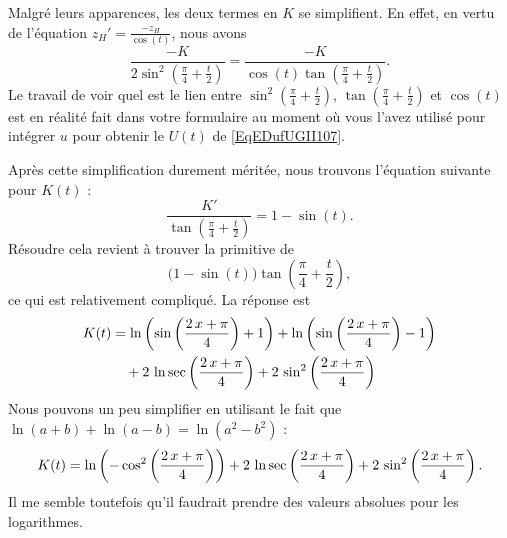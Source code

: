 \begin{example}
\begin{equation}
	\end{equation}
	Malgré leurs apparences, les deux termes en \( K\) se simplifient. En effet, en vertu de l'équation \( z_H'=\frac{ -z_H }{ \cos(t) }\), nous avons
	\begin{equation}
		\frac{ -K }{ 2\sin^2\left( \frac{ \pi }{ 4 }+\frac{ t }{ 2 } \right)}=\frac{ -K }{ \cos(t)\tan\left( \frac{ \pi }{ 4 }+\frac{ t }{ 2 } \right) }.
	\end{equation}
	Le travail de voir quel est le lien entre \( \sin^2\left( \frac{ \pi }{ 4 }+\frac{ t }{ 2 } \right)\), \( \tan\left( \frac{ \pi }{ 4 }+\frac{ t }{ 2 } \right)\) et \( \cos(t)\) est en réalité fait dans votre formulaire au moment où vous l'avez utilisé pour intégrer \( u\) pour obtenir le \( U(t)\) de \eqref{EqEDufUGII107}.

	Après cette simplification durement méritée, nous trouvons l'équation suivante pour \( K(t)\) :
	\begin{equation}		\label{EDEqFracII107exoVVprb}
		\frac{ K' }{ \tan\left( \frac{ \pi }{ 4 }+\frac{ t }{ 2 } \right) }=1-\sin(t).
	\end{equation}
	Résoudre cela revient à trouver la primitive de
	\begin{equation}
		\big( 1-\sin(t) \big) \tan\left( \frac{ \pi }{ 4 }+\frac{ t }{ 2 } \right),
	\end{equation}
	ce qui est relativement compliqué. La réponse est
	\begin{equation}
		\begin{aligned}[]
			K(t) & =\ln \left(\sin \left({{2\,x+\pi}\over{4}}\right)+1\right)+\ln  \left(\sin \left({{2\,x+\pi}\over{4}}\right)-1\right) \\
			     & \quad+2\,\ln \sec  \left({{2\,x+\pi}\over{4}}\right)+2\,\sin ^2\left({{2\,x+\pi}\over{4 }}\right)
		\end{aligned}
	\end{equation}
	Nous pouvons un peu simplifier en utilisant le fait que \( \ln(a+b)+\ln(a-b)=\ln(a^2-b^2)\) :
	\begin{equation}
		\begin{aligned}[]
			K(t)	=\ln\left(-\cos^2 \left({{2\,x+\pi}\over{4}}\right)\right)
			+2\,\ln \sec  \left({{2\,x+\pi}\over{4}}\right)+2\,\sin ^2\left({{2\,x+\pi}\over{4 }}\right).
		\end{aligned}
	\end{equation}
	Il me semble toutefois qu'il faudrait prendre des valeurs absolues pour les logarithmes.

\end{example}

